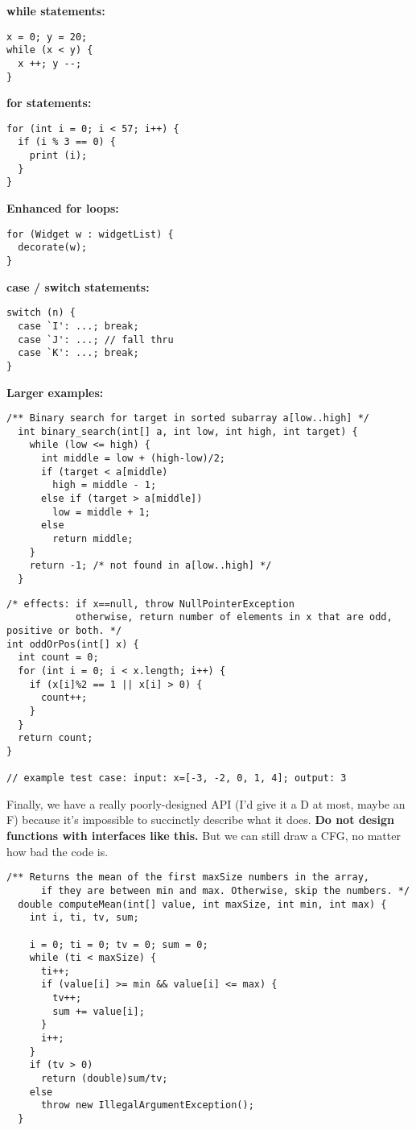 \documentclass[11pt]{article}
\begin{document}
\newpage

{\bf while statements:}

\begin{lstlisting}
x = 0; y = 20;
while (x < y) {
  x ++; y --;
}
\end{lstlisting}

{\bf for statements:} 

\begin{lstlisting}
for (int i = 0; i < 57; i++) {
  if (i % 3 == 0) {
    print (i);
  }
}
\end{lstlisting}

{\bf Enhanced for loops:} 
\begin{lstlisting}
for (Widget w : widgetList) {
  decorate(w);
}
\end{lstlisting}


{\bf case / switch statements:} 

\begin{lstlisting}
switch (n) {
  case `I': ...; break;
  case `J': ...; // fall thru
  case `K': ...; break;
}
\end{lstlisting}

{\bf Larger examples:}
\begin{lstlisting}[basicstyle=\scriptsize\ttfamily]
  /** Binary search for target in sorted subarray a[low..high] */
  int binary_search(int[] a, int low, int high, int target) {
    while (low <= high) {
      int middle = low + (high-low)/2;
      if (target < a[middle)
        high = middle - 1;
      else if (target > a[middle])
        low = middle + 1;
      else
        return middle;
    }
    return -1; /* not found in a[low..high] */
  }
\end{lstlisting}

\begin{lstlisting}[basicstyle=\scriptsize\ttfamily]
/* effects: if x==null, throw NullPointerException
            otherwise, return number of elements in x that are odd, positive or both. */
int oddOrPos(int[] x) {
  int count = 0;
  for (int i = 0; i < x.length; i++) {
    if (x[i]%2 == 1 || x[i] > 0) {
      count++;
    }
  }
  return count;
}

// example test case: input: x=[-3, -2, 0, 1, 4]; output: 3  
\end{lstlisting}

\newpage
Finally, we have a really poorly-designed API (I'd give it a D at most,
maybe an F) because it's impossible to succinctly describe what it
does. {\bf Do not design functions with interfaces like this.} But we
can still draw a CFG, no matter how bad the code is.
\begin{lstlisting}[basicstyle=\scriptsize\ttfamily]
  /** Returns the mean of the first maxSize numbers in the array,
      if they are between min and max. Otherwise, skip the numbers. */
  double computeMean(int[] value, int maxSize, int min, int max) {
    int i, ti, tv, sum;

    i = 0; ti = 0; tv = 0; sum = 0;
    while (ti < maxSize) {
      ti++;
      if (value[i] >= min && value[i] <= max) {
        tv++;
        sum += value[i];
      }
      i++;
    }
    if (tv > 0)
      return (double)sum/tv;
    else
      throw new IllegalArgumentException();
  }
\end{lstlisting}
\end{document}
